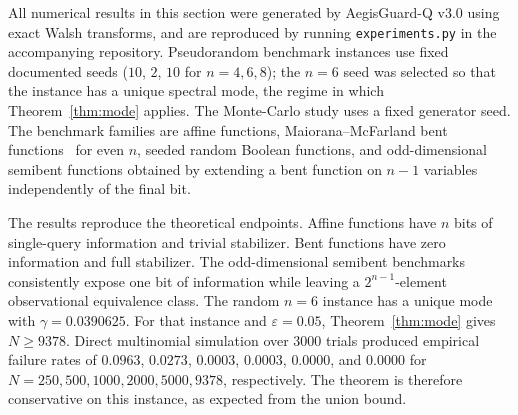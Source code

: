 \documentclass[10pt,twocolumn]{article}
\theoremstyle{definition}
\begin{document}
All numerical results in this section were generated by AegisGuard-Q v3.0 using exact Walsh transforms, and are reproduced by running \texttt{experiments.py} in the accompanying repository. Pseudorandom benchmark instances use fixed documented seeds ($10$, $2$, $10$ for $n = 4, 6, 8$); the $n = 6$ seed was selected so that the instance has a unique spectral mode, the regime in which Theorem~\ref{thm:mode} applies. The Monte-Carlo study uses a fixed generator seed. The benchmark families are affine functions, Maiorana--McFarland bent functions~\cite{carlet2021} for even $n$, seeded random Boolean functions, and odd-dimensional semibent functions obtained by extending a bent function on $n-1$ variables independently of the final bit.

The results reproduce the theoretical endpoints. Affine functions have $n$ bits of single-query information and trivial stabilizer. Bent functions have zero information and full stabilizer. The odd-dimensional semibent benchmarks consistently expose one bit of information while leaving a $2^{n-1}$-element observational equivalence class. The random $n = 6$ instance has a unique mode with $\gamma = 0.0390625$. For that instance and $\varepsilon = 0.05$, Theorem~\ref{thm:mode} gives $N \geq 9378$. Direct multinomial simulation over 3000 trials produced empirical failure rates of $0.0963$, $0.0273$, $0.0003$, $0.0003$, $0.0000$, and $0.0000$ for $N = 250, 500, 1000, 2000, 5000, 9378$, respectively. The theorem is therefore conservative on this instance, as expected from the union bound.
\end{document}
